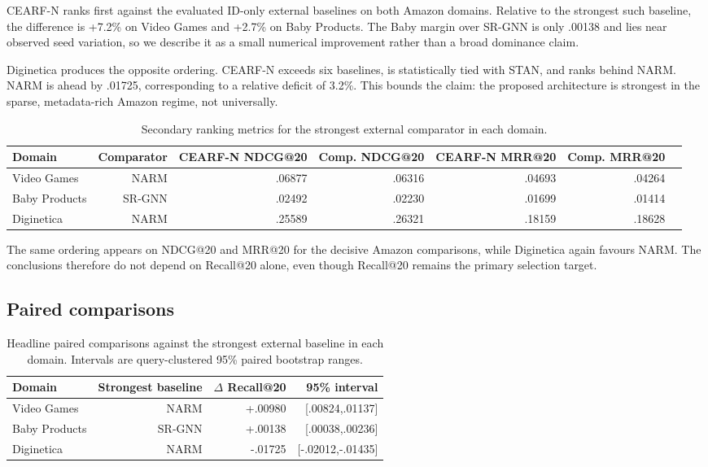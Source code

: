 \documentclass[runningheads]{llncs}
\newcommand{\method}{CEARF-N}
\begin{document}
\method{} ranks first against the evaluated ID-only external baselines on both
Amazon domains. Relative to the strongest such baseline, the difference is
+7.2\% on Video Games and +2.7\% on Baby Products. The Baby margin over
SR-GNN is only .00138 and lies near observed seed variation, so we describe
it as a small numerical improvement rather than a broad dominance claim.

Diginetica produces the opposite ordering. \method{} exceeds six baselines, is
statistically tied with STAN, and ranks behind NARM. NARM is ahead by .01725,
corresponding to a relative deficit of 3.2\%. This bounds the claim: the
proposed architecture is strongest in the sparse, metadata-rich Amazon regime,
not universally.

\begin{table}[t]
\caption{Secondary ranking metrics for the strongest external comparator in
each domain.}
\label{tab:secondary}\centering\small
\begin{tabular}{lrrrrrr}
\toprule
Domain & Comparator & \method{} NDCG@20 & Comp. NDCG@20 & \method{} MRR@20 & Comp. MRR@20 \\
\midrule
Video Games & NARM & .06877 & .06316 & .04693 & .04264 \\
Baby Products & SR-GNN & .02492 & .02230 & .01699 & .01414 \\
Diginetica & NARM & .25589 & .26321 & .18159 & .18628 \\
\bottomrule
\end{tabular}
\end{table}

The same ordering appears on NDCG@20 and MRR@20 for the decisive Amazon
comparisons, while Diginetica again favours NARM. The conclusions therefore
do not depend on Recall@20 alone, even though Recall@20 remains the primary
selection target.

\subsection{Paired comparisons}
\begin{table}[t]
\caption{Headline paired comparisons against the strongest external baseline in
each domain. Intervals are query-clustered 95\% paired bootstrap ranges.}
\label{tab:headline-paired}\centering\small
\begin{tabular}{lrrr}
\toprule Domain & Strongest baseline & $\Delta$ Recall@20 & 95\% interval \\
\midrule
Video Games & NARM & +.00980 & [.00824,.01137] \\
Baby Products & SR-GNN & +.00138 & [.00038,.00236] \\
Diginetica & NARM & -.01725 & [-.02012,-.01435] \\
\bottomrule
\end{tabular}
\end{table}
\end{document}

